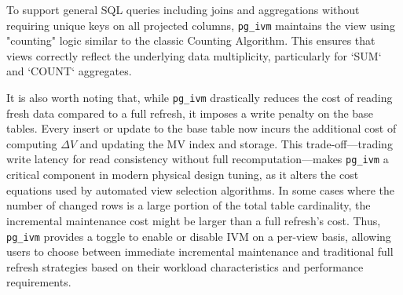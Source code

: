To support general SQL queries including joins and aggregations without requiring unique keys on all projected columns, \texttt{pg\_ivm} maintains the view using "counting" logic similar to the classic Counting Algorithm. This ensures that views correctly reflect the underlying data multiplicity, particularly for `SUM` and `COUNT` aggregates.

It is also worth noting that, while \texttt{pg\_ivm} drastically reduces the cost of reading fresh data compared to a full refresh, it imposes a write penalty on the base tables. Every insert or update to the base table now incurs the additional cost of computing $\Delta V$ and updating the \ac{MV} index and storage. This trade-off—trading write latency for read consistency without full recomputation—makes \texttt{pg\_ivm} a critical component in modern physical design tuning, as it alters the cost equations used by automated view selection algorithms. In some cases where the number of changed rows is a large portion of the total table cardinality, the incremental maintenance cost might be larger than a full refresh's cost. Thus, \texttt{pg\_ivm} provides a toggle to enable or disable \ac{IVM} on a per-view basis, allowing users to choose between immediate incremental maintenance and traditional full refresh strategies based on their workload characteristics and performance requirements. 
